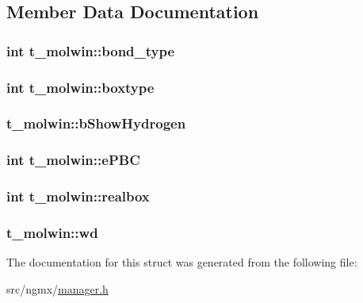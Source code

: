 \subsection{\-Member \-Data \-Documentation}
\hypertarget{structt__molwin_aacbbc705800534ed290243a328becb71}{
\subsubsection[{bond\-\_\-type}]{\setlength{\rightskip}{0pt plus 5cm}int {\bf t\-\_\-molwin\-::bond\-\_\-type}}}\label{structt__molwin_aacbbc705800534ed290243a328becb71}
\hypertarget{structt__molwin_a379b4fee0d4e5d4271b8bbc347ef4016}{
\subsubsection[{boxtype}]{\setlength{\rightskip}{0pt plus 5cm}int {\bf t\-\_\-molwin\-::boxtype}}}\label{structt__molwin_a379b4fee0d4e5d4271b8bbc347ef4016}
\hypertarget{structt__molwin_aa02a11f4bf1272e8b8a14bf9bdb9dc8e}{
\subsubsection[{b\-Show\-Hydrogen}]{ {\bf t\-\_\-molwin\-::b\-Show\-Hydrogen}}}\label{structt__molwin_aa02a11f4bf1272e8b8a14bf9bdb9dc8e}
\hypertarget{structt__molwin_a3faf1fc4cff4ea2ba036f39587b025e5}{
\subsubsection[{e\-P\-B\-C}]{\setlength{\rightskip}{0pt plus 5cm}int {\bf t\-\_\-molwin\-::e\-P\-B\-C}}}\label{structt__molwin_a3faf1fc4cff4ea2ba036f39587b025e5}
\hypertarget{structt__molwin_a3106e44cac2342a4a82efb7f05a52dbf}{
\subsubsection[{realbox}]{\setlength{\rightskip}{0pt plus 5cm}int {\bf t\-\_\-molwin\-::realbox}}}\label{structt__molwin_a3106e44cac2342a4a82efb7f05a52dbf}
\hypertarget{structt__molwin_a17359f1f9fd919f2c4dd92e799952334}{
\subsubsection[{wd}]{ {\bf t\-\_\-molwin\-::wd}}}\label{structt__molwin_a17359f1f9fd919f2c4dd92e799952334}


\-The documentation for this struct was generated from the following file\-:\begin{DoxyCompactItemize}
\item 
src/ngmx/\hyperlink{manager_8h}{manager.\-h}\end{DoxyCompactItemize}
